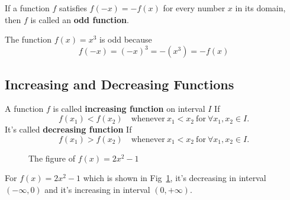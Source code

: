 \begin{defn}\label{defn:odd_func}
    If a function $f$ satisfies $f(-x) = -f(x)$ for every number $x$ in its domain, then $f$ 
    is called an \textbf{odd function}.
\end{defn}

\begin{example}
    The function $f(x) = x^3$ is odd because
    $$
        f(-x) = (-x)^3 = -(x^3) = -f(x)
    $$
\end{example}

\subsection{Increasing and Decreasing Functions}
\begin{defn}\label{defn:inc_dec_func}
    A function $f$ is called \textbf{increasing function} on interval $I$ If
    $$
        f(x_1) < f(x_2) \quad \text{whenever} ~ x_1 < x_2 ~ \text{for} ~ \forall x_1, x_2 \in I.
    $$
    It's called \textbf{decreasing function} If
    $$
    f(x_1) > f(x_2) \quad \text{whenever} ~ x_1 < x_2 ~ \text{for} ~ \forall x_1, x_2 \in I.
    $$
\end{defn}

\begin{figure}[!htb]
    \centering
    \caption{The figure of $f(x) = 2x^2 - 1$}
    \label{fig:inc_dec_func}
\end{figure}

\begin{example}
    For $f(x) = 2x^2 - 1$ which is shown in Fig~\ref{fig:inc_dec_func},
    it's decreasing in interval $(-\infty, 0)$ and it's increasing in interval $(0, +\infty)$.
\end{example}